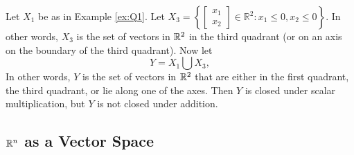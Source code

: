 \documentclass{ximera}
\begin{document}
\begin{example}
\begin{explanation}
\begin{center}
\quad
{}
\end{center}
\end{explanation}
\end{example}

\begin{example} \label{ex:Q1-3}
Let $X_1$ be as in Example \ref{ex:Q1}.  Let $X_3=\left\{\begin{bmatrix} x_1\\x_2\end{bmatrix} \in \mathbb{R}^2 : x_1 \le 0, x_2 \le 0 \right\}$.
In other words, $X_3$ is the set of vectors in $\mathbb{R}^2$ in the third quadrant (or on an axis on the boundary of the third quadrant).  Now let 
$$Y = X_1 \bigcup X_3,$$ 
In other words, $Y$ is the set of vectors in $\mathbb{R}^2$ that are either in the first quadrant, the third quadrant, or lie along one of the axes.  Then $Y$ is closed under scalar multiplication, but $Y$ is not closed under addition.

\end{example}


 
\subsection*{$\mathbb{R}^n$ as a Vector Space}
\end{document}

